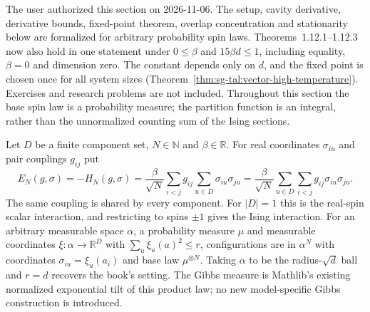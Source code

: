 \begin{remark}\label{rem:sg-tal:vector-status}
The user authorized this section on 2026-11-06. The setup, cavity derivative,
derivative bounds, fixed-point theorem, overlap concentration and stationarity below are
formalized for arbitrary probability spin laws. Theorems~1.12.1--1.12.3 now also hold
in one statement under $0\le\beta$ and $15\beta d\le1$, including equality, $\beta=0$
and dimension zero. The constant depends only on $d$, and the fixed point is chosen once
for all system sizes (Theorem~\ref{thm:sg-tal:vector-high-temperature}).
Exercises and research problems are not included.
Throughout this section the base spin law is a probability measure; the partition function
is an integral, rather than the unnormalized counting sum of the Ising sections.
\end{remark}

\begin{definition}\label{def:sg-tal:vector-energy}
\leanok
{}
Let $D$ be a finite component set, $N\in\mathbb N$ and $\beta\in\mathbb R$.
For real coordinates $\sigma_{iu}$ and pair couplings $g_{ij}$ put
\[
E_N(g,\sigma)=-H_N(g,\sigma)
=\frac{\beta}{\sqrt N}\sum_{i<j}g_{ij}\sum_{u\in D}\sigma_{iu}\sigma_{ju}
=\frac{\beta}{\sqrt N}\sum_{u\in D}\sum_{i<j}g_{ij}\sigma_{iu}\sigma_{ju}.
\]
The same coupling is shared by every component. For $|D|=1$ this is the real-spin
scalar interaction, and restricting to spins $\pm1$ gives the Ising interaction.
For an arbitrary measurable space $\alpha$, a probability measure $\mu$ and measurable
coordinates $\xi:\alpha\to\mathbb R^D$ with $\sum_u\xi_u(a)^2\le r$, configurations
are in $\alpha^N$ with coordinates $\sigma_{iu}=\xi_u(a_i)$ and base law $\mu^{\otimes N}$.
Taking $\alpha$ to be the radius-$\sqrt d$ ball and $r=d$ recovers the book's setting.
The Gibbs measure is Mathlib's existing normalized exponential tilt of this product law;
no new model-specific Gibbs construction is introduced.
\end{definition}

